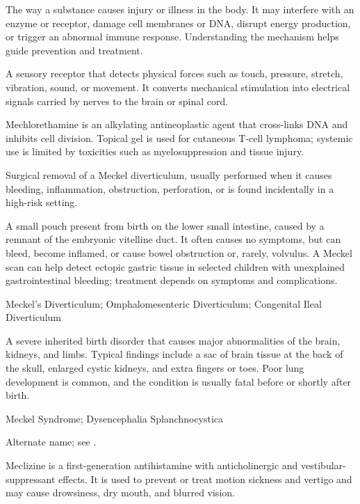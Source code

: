  The way a substance causes injury or illness in the body. It may interfere with an enzyme or receptor, damage cell membranes or DNA, disrupt energy production, or trigger an abnormal immune response. Understanding the mechanism helps guide prevention and treatment.

 A sensory receptor that detects physical forces such as touch, pressure, stretch, vibration, sound, or movement. It converts mechanical stimulation into electrical signals carried by nerves to the brain or spinal cord.

 Mechlorethamine is an alkylating antineoplastic agent that cross-links DNA and inhibits cell division. Topical gel is used for cutaneous T-cell lymphoma; systemic use is limited by toxicities such as myelosuppression and tissue injury.

 Surgical removal of a Meckel diverticulum, usually performed when it causes bleeding, inflammation, obstruction, perforation, or is found incidentally in a high-risk setting.

 A small pouch present from birth on the lower small intestine, caused by a remnant of the embryonic vitelline duct. It often causes no symptoms, but can bleed, become inflamed, or cause bowel obstruction or, rarely, volvulus. A Meckel scan can help detect ectopic gastric tissue in selected children with unexplained gastrointestinal bleeding; treatment depends on symptoms and complications.

\synonyms
Meckel's Diverticulum; Omphalomesenteric Diverticulum; Congenital Ileal Diverticulum

 A severe inherited birth disorder that causes major abnormalities of the brain, kidneys, and limbs. Typical findings include a sac of brain tissue at the back of the skull, enlarged cystic kidneys, and extra fingers or toes. Poor lung development is common, and the condition is usually fatal before or shortly after birth.

\synonyms
Meckel Syndrome; Dysencephalia Splanchnocystica

 Alternate name; see .

 Meclizine is a first-generation antihistamine with anticholinergic and vestibular-suppressant effects. It is used to prevent or treat motion sickness and vertigo and may cause drowsiness, dry mouth, and blurred vision.

